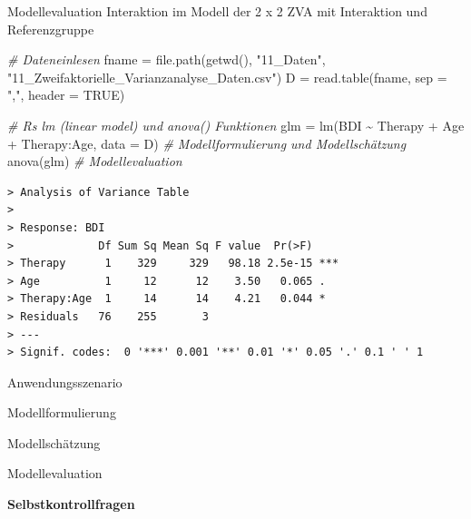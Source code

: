 \documentclass[
  8pt,
  ignorenonframetext,
]{beamer}
\newenvironment{Shaded}{\begin{snugshade}}{\end{snugshade}}
\newcommand{\AttributeTok}[1]{\textcolor[rgb]{0.77,0.63,0.00}{#1}}
\newcommand{\CommentTok}[1]{\textcolor[rgb]{0.56,0.35,0.01}{\textit{#1}}}
\newcommand{\ConstantTok}[1]{\textcolor[rgb]{0.00,0.00,0.00}{#1}}
\newcommand{\FunctionTok}[1]{\textcolor[rgb]{0.00,0.00,0.00}{#1}}
\newcommand{\NormalTok}[1]{#1}
\newcommand{\OtherTok}[1]{\textcolor[rgb]{0.56,0.35,0.01}{#1}}
\newcommand{\SpecialCharTok}[1]{\textcolor[rgb]{0.00,0.00,0.00}{#1}}
\newcommand{\StringTok}[1]{\textcolor[rgb]{0.31,0.60,0.02}{#1}}
\begin{document}
\begin{frame}[fragile]{\small Modellevaluation \textbar{} Interaktion im
Modell der 2 x 2 ZVA mit Interaktion und Referenzgruppe}
\begin{Shaded}
\begin{Highlighting}[]
\CommentTok{\# Dateneinlesen}
\NormalTok{fname      }\OtherTok{=} \FunctionTok{file.path}\NormalTok{(}\FunctionTok{getwd}\NormalTok{(), }\StringTok{"11\_Daten"}\NormalTok{, }\StringTok{"11\_Zweifaktorielle\_Varianzanalyse\_Daten.csv"}\NormalTok{)}
\NormalTok{D          }\OtherTok{=} \FunctionTok{read.table}\NormalTok{(fname, }\AttributeTok{sep =} \StringTok{","}\NormalTok{, }\AttributeTok{header =} \ConstantTok{TRUE}\NormalTok{)}

\CommentTok{\# R\textquotesingle{}s lm (linear model) und anova() Funktionen}
\NormalTok{glm        }\OtherTok{=} \FunctionTok{lm}\NormalTok{(BDI }\SpecialCharTok{\textasciitilde{}}\NormalTok{ Therapy }\SpecialCharTok{+}\NormalTok{ Age }\SpecialCharTok{+}\NormalTok{ Therapy}\SpecialCharTok{:}\NormalTok{Age, }\AttributeTok{data =}\NormalTok{ D)   }\CommentTok{\# Modellformulierung und Modellschätzung}
\FunctionTok{anova}\NormalTok{(glm)                                                     }\CommentTok{\# Modellevaluation}
\end{Highlighting}
\end{Shaded}

\begin{verbatim}
> Analysis of Variance Table
> 
> Response: BDI
>             Df Sum Sq Mean Sq F value  Pr(>F)    
> Therapy      1    329     329   98.18 2.5e-15 ***
> Age          1     12      12    3.50   0.065 .  
> Therapy:Age  1     14      14    4.21   0.044 *  
> Residuals   76    255       3                    
> ---
> Signif. codes:  0 '***' 0.001 '**' 0.01 '*' 0.05 '.' 0.1 ' ' 1
\end{verbatim}
\end{frame}

\begin{frame}{}
\protect\hypertarget{section-8}{}
\large
{}
\vfill

Anwendungsszenario

Modellformulierung

Modellschätzung

Modellevaluation

\textbf{Selbstkontrollfragen} \vfill
\end{frame}
\end{document}
